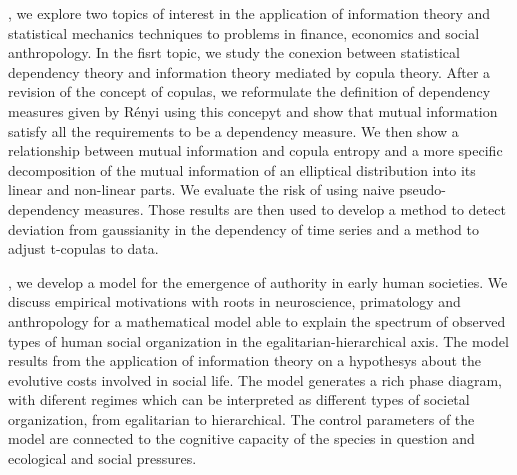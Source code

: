 , we explore two topics of interest in the application of information theory and statistical mechanics techniques to problems in finance, economics and social anthropology. In the fisrt topic, we study the conexion between statistical dependency theory and information theory mediated by copula theory. After a revision of the concept of copulas, we reformulate the definition of dependency measures given by Rényi \cite{Renyi1959} using this concepyt and show that mutual information satisfy all the requirements to be a dependency measure. We then show a relationship between mutual information and copula entropy and a more specific decomposition of the mutual information of an elliptical distribution into its linear and non-linear parts. We evaluate the risk of using naive pseudo-dependency measures. Those results are then used to develop a method to detect deviation from gaussianity in the dependency of time series and a method to adjust t-copulas to data\cite{Calsaverini2009}.

, we develop a model for the emergence of authority in early human societies. We discuss empirical motivations with roots in neuroscience, primatology and anthropology for a mathematical model able to explain the spectrum of observed types of human social organization in the egalitarian-hierarchical axis. The model results from the application of information theory on a hypothesys about the evolutive costs involved in social life. The model generates a rich phase diagram, with diferent regimes which can be interpreted as different types of societal organization, from egalitarian to hierarchical. The control parameters of the model are connected to the cognitive capacity of the species in question and ecological and social pressures.